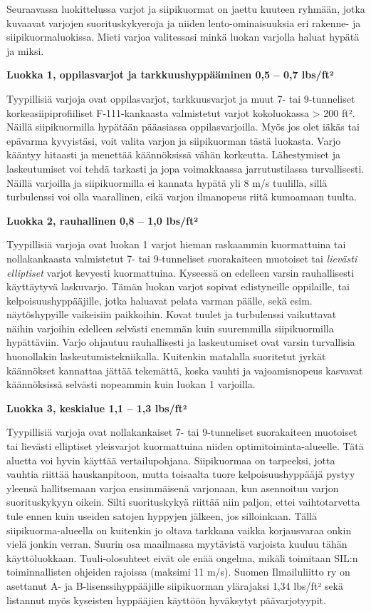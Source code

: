 Seuraavassa luokittelussa varjot ja siipikuormat on jaettu kuuteen ryhmään, jotka kuvaavat varjojen suorituskykyeroja ja niiden lento-ominaisuuksia eri rakenne- ja siipikuormaluokissa. Mieti varjoa valitessasi minkä luokan varjolla haluat hypätä ja miksi. 


\textbf{Luokka 1, oppilasvarjot ja tarkkuushyppääminen 0,5 – 0,7 lbs/ft²} 


Tyypillisiä varjoja ovat oppilasvarjot, tarkkuusvarjot ja muut 7- tai 9-tunneliset korkeasiipiprofiiliset F-111-kankaasta valmistetut varjot kokoluokassa > 200 ft². Näillä siipikuormilla hypätään pääasiassa oppilasvarjoilla. Myös jos olet iäkäs tai epävarma kyvyistäsi, voit valita varjon ja siipikuorman tästä luokasta. Varjo kääntyy hitaasti ja menettää käännöksissä vähän korkeutta. Lähestymiset ja laskeutumiset voi tehdä tarkasti ja jopa voimakkaassa jarrutustilassa turvallisesti. Näillä varjoilla ja siipikuormilla ei kannata hypätä yli 8 m/s tuulilla, sillä turbulenssi voi olla vaarallinen, eikä varjon ilmanopeus riitä kumoamaan tuulta. 


\textbf{Luokka 2, rauhallinen 0,8 – 1,0 lbs/ft²} 


Tyypillisiä varjoja ovat luokan 1 varjot hieman raskaammin kuormattuina tai nollakankaasta valmistetut 7- tai 9-tunneliset suorakaiteen muotoiset tai \textit{lievästi elliptiset} varjot kevyesti kuormattuina. Kyseessä on edelleen varsin rauhallisesti käyttäytyvä laskuvarjo. Tämän luokan varjot sopivat edistyneille oppilaille, tai kelpoisuushyppääjille, jotka haluavat pelata varman päälle, sekä esim. näytöshypyille vaikeisiin paikkoihin. Kovat tuulet ja turbulenssi vaikuttavat näihin varjoihin edelleen selvästi enemmän kuin suuremmilla siipikuormilla hypättäviin. Varjo ohjautuu rauhallisesti ja laskeutumiset ovat varsin turvallisia huonollakin laskeutumistekniikalla. Kuitenkin matalalla suoritetut jyrkät käännökset kannattaa jättää tekemättä, koska vauhti ja vajoamisnopeus kasvavat käännöksissä selvästi nopeammin kuin luokan 1 varjoilla. 


\textbf{Luokka 3, keskialue 1,1 – 1,3 lbs/ft²} 


Tyypillisiä varjoja ovat nollakankaiset 7- tai 9-tunneliset suorakaiteen muotoiset tai lievästi elliptiset yleisvarjot kuormattuina niiden optimitoiminta-alueelle. Tätä aluetta voi hyvin käyttää vertailupohjana. Siipikuormaa on tarpeeksi, jotta vauhtia riittää hauskanpitoon, mutta toisaalta tuore kelpoisuushyppääjä pystyy yleensä hallitsemaan varjoa ensimmäisenä varjonaan, kun asennoituu varjon suorituskykyyn oikein. Silti suorituskykyä riittää niin paljon, ettei vaihtotarvetta tule ennen kuin useiden satojen hyppyjen jälkeen, jos silloinkaan. Tällä siipikuorma-alueella on kuitenkin jo oltava tarkkana vaikka korjausvaraa onkin vielä jonkin verran. Suurin osa maailmassa myytävistä varjoista kuuluu tähän käyttöluokkaan. Tuuli-olosuhteet eivät ole enää ongelma, mikäli toimitaan SIL:n toiminnallisten ohjeiden rajoissa (maksimi 11 m/s). Suomen Ilmailuliitto ry on asettanut A- ja B-lisenssihyppääjille siipikuorman ylärajaksi 1,34 lbs/ft² sekä listannut myös kyseisten hyppääjien käyttöön hyväksytyt päävarjotyypit. 


